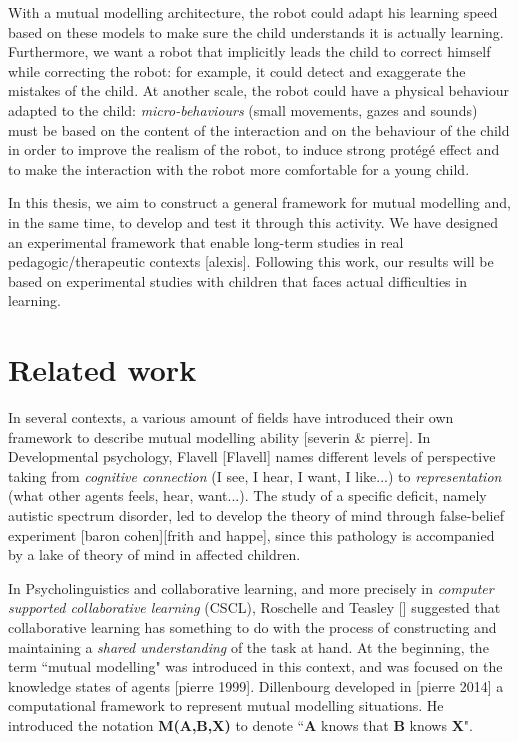 \documentclass[10pt,a4paper,twocolumn]{article}
\begin{document}
With a mutual modelling architecture, the robot could adapt his learning speed based on these models to make sure the child understands it is actually learning. Furthermore, we want a robot that implicitly leads the child to correct himself while correcting the robot: for example, it could detect and exaggerate the mistakes of the child. At another scale, the robot could have a physical behaviour adapted to the child: \textit{micro-behaviours} (small movements, gazes and sounds) must be based on the content of the interaction and on the behaviour of the child in order to improve the realism of the robot, to induce strong prot\'eg\'e effect and to make the interaction with the robot more comfortable for a young child. 

In this thesis, we aim to construct a general framework for mutual modelling and, in the same time, to develop and test it through this activity. We have designed an experimental framework that enable long-term studies in real pedagogic/therapeutic contexts [alexis]. Following this work, our results will be based on experimental studies with children that faces actual difficulties in learning. 

\section{Related work}


In several contexts, a various amount of fields have introduced their own framework to describe mutual modelling ability [severin \& pierre]. 
In Developmental psychology, Flavell [Flavell] names different levels of perspective taking from \textit{cognitive connection} (I see, I hear, I want, I like...) to \textit{representation} (what other agents feels, hear, want...). The study of a specific deficit, namely autistic spectrum disorder, led to develop the theory of mind through false-belief experiment [baron cohen][frith and happe], since this pathology is accompanied by a lake of theory of mind in affected children. 

In Psycholinguistics and collaborative learning, and more precisely in \textit{computer supported collaborative learning} (CSCL), Roschelle and Teasley [] suggested that collaborative learning has something to do with the process of constructing and maintaining a \textit{shared understanding} of the task at hand. 
At the beginning, the term ``mutual modelling" was introduced in this context, and was focused on the knowledge states of agents [pierre 1999].  Dillenbourg developed in [pierre 2014] a computational framework to represent mutual modelling situations. He introduced the notation \textbf{M(A,B,X)} to denote ``\textbf{A} knows that \textbf{B} knows \textbf{X}".
\end{document}
